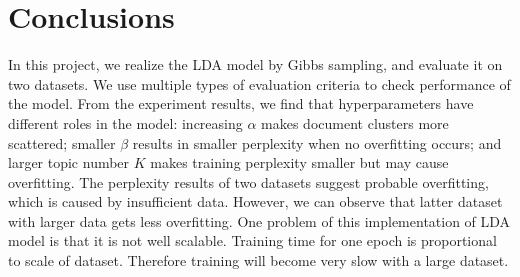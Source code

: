 \documentclass{article} %
\begin{document}
\section{Conclusions}

In this project, we realize the LDA model by Gibbs sampling, and evaluate it on two datasets. We use multiple types of evaluation criteria to check performance of the model. From the experiment results, we find that hyperparameters have different roles in the model: increasing $\alpha$ makes document clusters more scattered; smaller $\beta$ results in smaller perplexity when no overfitting occurs; and larger topic number $K$ makes training perplexity smaller but may cause overfitting. The perplexity results of two datasets suggest probable overfitting, which is caused by insufficient data. However, we can observe that latter dataset with larger data gets less overfitting. One problem of this implementation of LDA model is that it is not well scalable. Training time for one epoch is proportional to scale of dataset. Therefore training will become very slow with a large dataset.



\end{document}
